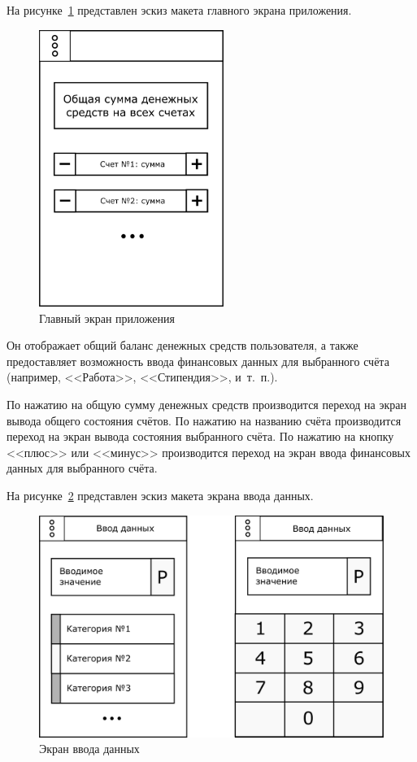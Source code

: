 На рисунке~\ref{fig:screen_main} представлен эскиз макета главного экрана приложения.

\begin{figure}[h!]
  \centering
  \includegraphics[width=60mm]{pic/screen_main}
  \caption{Главный экран приложения}
  \label{fig:screen_main}
\end{figure}

Он отображает общий баланс денежных средств пользователя,
а также предоставляет возможность ввода финансовых данных для
выбранного счёта (например, <<Работа>>, <<Стипендия>>, и~т.~п.).

По нажатию на общую сумму денежных средств производится переход на
экран вывода общего состояния счётов.
По нажатию на названию счёта производится переход на
экран вывода состояния выбранного счёта.
По нажатию на кнопку <<плюс>> или <<минус>> производится переход на
экран ввода финансовых данных для выбранного счёта.

На рисунке~\ref{fig:screen_input} представлен эскиз макета экрана ввода данных.

\begin{figure}[h!]
  \centering
  \includegraphics[width=130mm]{pic/screen_input}
  \caption{Экран ввода данных}
  \label{fig:screen_input}
\end{figure}

